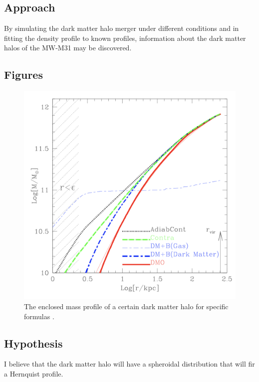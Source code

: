 \documentclass{aastex63}
\begin{document}
\subsection{Approach} \label{subsec:approach}
By simulating the dark matter halo merger under different conditions and in fitting the density profile to known profiles, information about the dark matter halos of the MW-M31 may be discovered.

\subsection{Figures} \label{subsec:figures}
\begin{figure}[h!]
\centering
\includegraphics[scale=0.35]{Fig2.png}
\caption{The enclosed mass profile of a certain dark matter halo for specific formulas
\citep{Abadi2010}.}
\label{fig:universe}
\end{figure}

\subsection{Hypothesis} \label{subsec:hypothesis}
I believe that the dark matter halo will have a spheroidal distribution that will fir a Hernquist profile.
{}

\end{document}
